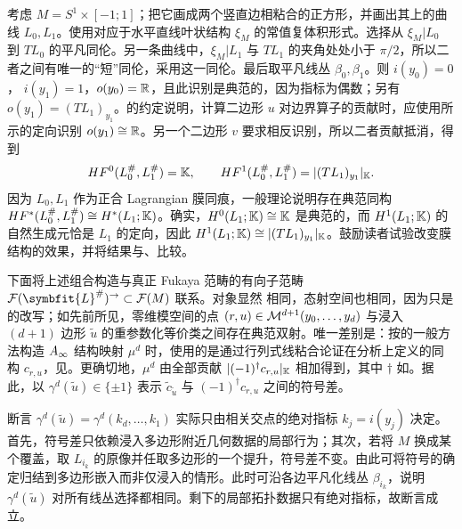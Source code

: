\begin{example}\label{st:13.5}
考虑 $M=S^1\times[-1;1]$；把它画成两个竖直边相粘合的正方形，并画出其上的曲线 $L_0,\allowbreak L_1$。使用对应于水平直线叶状结构 $\xi_M$ 的常值复体积形式。选择从 $\xi_M|L_0$ 到 $TL_0$ 的平凡同伦。另一条曲线中，$\xi_M|L_1$ 与 $TL_1$ 的夹角处处小于 $\pi/2$，所以二者之间有唯一的“短”同伦，采用这一同伦。最后取平凡线丛 $\beta_0,\allowbreak \beta_1$。则 $i(y_0)=0$，
$i(y_1)=1$，$o(y_0)=\mathbb R$，且此识别是典范的，因为指标为偶数；另有 $o(y_1)=(TL_1)_{y_1}$。的约定说明，计算二边形 $u$ 对边界算子的贡献时，应使用所示的定向识别 $o(y_1)\cong\mathbb R$。另一个二边形 $v$ 要求相反识别，所以二者贡献抵消，得到
\[
HF^0(L_0^\#,L_1^\#)=\mathbb K,\qquad HF^1(L_0^\#,L_1^\#)=|(TL_1)_{y_1}|_{\mathbb K}.
\]
因为 $L_0,\allowbreak L_1$ 作为正合 Lagrangian 膜同痕，一般理论说明存在典范同构 $HF^*(L_0^\#,\allowbreak L_1^\#)\cong H^*(L_1;\mathbb K)$。确实，$H^0(L_1;\mathbb K)\cong\mathbb K$ 是典范的，而 $H^1(L_1;\mathbb K)$ 的自然生成元恰是 $L_1$ 的定向，因此 $H^1(L_1;\mathbb K)\cong|(TL_1)_{y_1}|_{\mathbb K}$。鼓励读者试验改变膜结构的效果，并将结果与、比较。
\end{example}

下面将上述组合构造与真正 Fukaya 范畴的有向子范畴 $\F(\symbfit{L}^\#)^\to\subset\F(M)$ 联系。对象显然
相同，态射空间也相同，因为只是的改写；如先前所见，零维模空间的点 $(r,\allowbreak u)\in\mathcal M^{d+1}(y_0,\allowbreak \ldots,\allowbreak y_d)$ 与浸入 $(d+1)$ 边形 $\tilde u$ 的重参数化等价类之间存在典范双射。唯一差别是：按的一般方法构造 $A_\infty$ 结构映射 $\mu^d$ 时，使用的是通过行列式线粘合论证在分析上定义的同构 $c_{r,\allowbreak u}$，见。更确切地，$\mu^d$ 由全部贡献 $|(-1)^\dagger c_{r,\allowbreak u}|_{\mathbb K}$ 相加得到，其中 $\dagger$ 如。据此，以 $\gamma^d(\tilde u)\in\{\pm1\}$ 表示 $\tilde c_{\tilde u}$ 与 $(-1)^\dagger c_{r,\allowbreak u}$ 之间的符号差。

断言 $\gamma^d(\tilde u)=\gamma^d(k_d,\allowbreak \ldots,\allowbreak k_1)$ 实际只由相关交点的绝对指标 $k_j=i(y_j)$ 决定。首先，符号差只依赖浸入多边形附近几何数据的局部行为；其次，若将 $M$ 换成某个覆盖，取 $L_{i_k}$ 的原像并任取多边形的一个提升，符号差不变。由此可将符号的确定归结到多边形嵌入而非仅浸入的情形。此时可沿各边平凡化线丛 $\beta_{i_k}$，说明 $\gamma^d(\tilde u)$ 对所有线丛选择都相同。剩下的局部拓扑数据只有绝对指标，故断言成立。

